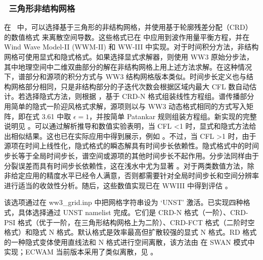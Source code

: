 \vssub
\subsubsection{~三角形非结构网格} \label{sub:num_space_tri}

\noindent
在 \ws\ 中，可以选择基于三角形的非结构网格，并使用基于轮廓残差分配（CRD）的数值格式 \citep{art:ricchiuto2005} 来离散空间导数。这些格式已在 \citep{rep:Roland2008} 中应用到波作用量平衡方程，并在 Wind Wave Model-II (WWM-II) 和 WW-III 中实现。对于时间积分方法，非结构网格可使用显式和隐式格式。如果选择显式求解器，则使用 WW3 原始分步法，其中地理空间中二维双曲部分的解在非结构网格上用上述方法求解。在这种情况下，谱部分和源项的积分方式与 WW3 结构网格版本类似。时间步长定义也与结构网格部分相同，只是非结构部分的子迭代次数会根据区域内最大 CFL 数自动估计。若选择隐式方法，则根据 \citep{rep:Roland2008}，基于 CRD-N 格式组装线性方程组。谱传播部分用简单的隐式一阶迎风格式求解，源项则以与 WW3 动态格式相同的方式写入矩阵，即在式 3.61 中取 $\epsilon = 1$，并按简单 Patankar 规则组装方程组。新实现的完整说明见 \cite{rolandetal2019t}。可以通过解析推导和数值实验表明，当 CFL \textless 1 时，显式和隐式方法给出相似结果。这也已在实际应用中得到展示，例如 \citep{rep:Abdolalli2018, Smith2018, rep:Abdolalli2019, AbdolaliEtAl2019OM}。不过，当 CFL \textgreater 1 时，由于源项在时间上线性化，隐式格式的瞬态解具有时间步长依赖性。隐式格式中的时间步长等于全局时间步长，谱空间或源项的其他时间步长不起作用。分步法同样由于分裂误差而具有时间步长依赖性，这在浅水中尤为显著 \citep{rep:Roland2008}。对于两类数值方法，除非给定应用的精度水平已经令人满意，否则都需要针对全局时间步长和空间分辨率进行适当的收敛性分析。随后，这些数值实现已在 WWIII 中得到评估 \citep[e.g.][]{art:Aea09,art:babanin2011,art:bertin2014,
art:bertin2015,art:dodet2013,art:ferrarin2008,art:ferrarin2013,art:janekovic2015,art:kerr2013,art:liau2011,art:Mea10,art:perrie2018,
art:perrie2013two,pro:rol2006a,pro:rol2006b,art:rol2009,art:rol2012,art:rol2014,art:sikiric2012,art:sikiric2013,art:sikiric2018,
pro:zanke2006}。


该选项通过在 {\file ww3\_grid.inp} 中把网格字符串设为 `{\code UNST}' 激活。已实现四种格式，具体选择通过 {\code UNST} namelist 完成。它们是 CRD-N 格式（一阶）、CRD-PSI 格式（优于一阶，在三角形结构网格上为二阶）、CRD-FCT 格式（二阶时空格式）和隐式 N 格式。默认格式是效率最高但扩散较强的显式 N 格式。RD 格式的一种隐式变体使用直线法和 N 格式进行空间离散，该方法由 \cite{art:Zij10} 在 SWAN 模式中实现；ECWAM 当前版本采用了类似离散，见 \cite{pro:rol2012}。

